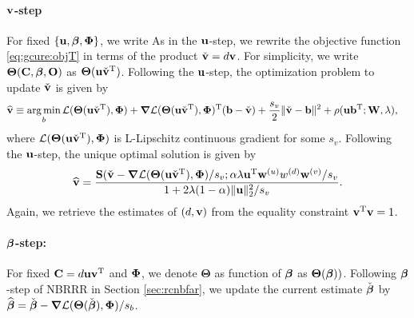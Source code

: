\documentclass[12pt]{article}
\def\trans{^{\rm T}}
\newcommand{\bbL}{\mathcal{L}}
\DeclareMathOperator*{\argmin}{arg\,min}
\newcommand{\bs}{\boldsymbol}
\begin{document}
\paragraph{${\bf v}$-step}\label{par:v}
For fixed $\{{\bf u}, \mbox{\boldmath $\beta$}, \mbox{\boldmath $\Phi$}\}$, we write 
As in the ${\bf u}$-step, we rewrite the objective function \eqref{eq:gcure:objT} in terms of the product $\check{{\bf v}} = d{\bf v}$. For simplicity, we write $\bs\Theta(\C,\bbeta,\bO)$ as $\bs\Theta(\u\check{\v}\trans)$.  Following the ${\bf u}$-step, the optimization problem to update $\check{{\bf v}}$ is given by 
\begin{align}
\what{\v} \equiv \argmin_{b} \bbL(\bs\Theta(\u\check{\v}\trans),\bPhi)  &+  \bs\nabla \bbL(\bs\Theta(\u\check{\v}\trans),\bPhi)\trans ( \b - \check{\v}) +\frac{s_v}{2} \|\check{\v} - \b\|^2 + \rho(\u\b\trans;\W,\lambda),
\end{align}
where  $\bbL(\bs\Theta(\u\check{\v}\trans),\bPhi)$ is  L-Lipschitz continuous gradient for some $s_v$. 
Following the ${\bf u}$-step, the unique optimal solution is given by 
\begin{align}
\what{\v} = \frac{ \mathcal{\S}(\check{\v} - \bs\nabla \bbL(\bs\Theta(\u\check{\v}\trans),\bPhi) /s_v; \alpha \lambda\u\trans\w^{(u)} w^{(d)} \w^{(v)}/s_v } {1+2\lambda(1-\alpha)\|\u\|_2^2/s_v}. \label{eq:vupdatestep}
\end{align}
Again, we retrieve the estimates of $(d,{\bf v})$ from the equality constraint $\v\trans\v = 1$. 


\paragraph{$\mbox{\boldmath $\beta$}$-step:}
For fixed  $\C = d\u\v\trans$ and $\mbox{\boldmath $\Phi$}$, we denote $\bs\Theta$ as function of $\mbox{\boldmath $\beta$}$ as $\bs\Theta(\bbeta))$.  Following $\mbox{\boldmath $\beta$}$-step of NBRRR in Section \ref{sec:rcnbfar}, we update the current estimate $\check{\mbox{\boldmath $\beta$}}$ by $\what{\bbeta}  = \check{\bbeta} - \bs\nabla \bbL(\bs\Theta(\check{\bbeta}),\bPhi)/s_b$. 
\end{document}
